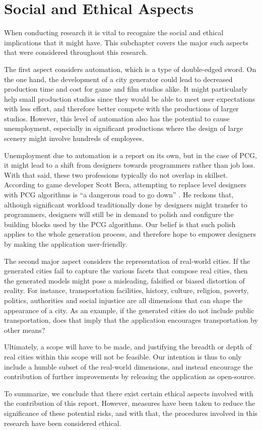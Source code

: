 \section{Social and Ethical Aspects}

When conducting research it is vital to recognize the social and ethical implications that it might have.
This subchapter covers the major such aspects that were considered throughout this research.

The first aspect considers automation, which is a type of double-edged sword.
On the one hand, the development of a city generator could lead to decreased production time and cost for game and film studios alike.
It might particularly help small production studios since they would be able to meet user expectations with less effort, and therefore better compete with the productions of larger studios.
However, this level of automation also has the potential to cause unemployment, especially in significant productions where the design of large scenery might involve hundreds of employees.

Unemployment due to automation is a report on its own, but in the case of PCG, it might lead to a shift from designers towards programmers rather than job loss.
With that said, these two professions typically do not overlap in skillset.
According to game developer Scott Beca, attempting to replace level designers with PCG algorithms is ``a dangerous road to go down'' \cite{gamasutra}.
He reckons that, although significant workload traditionally done by designers might transfer to programmers, designers will still be in demand to polish and configure the building blocks used by the PCG algorithms.
Our belief is that such polish applies to the whole generation process, and therefore hope to empower designers by making the application user-friendly.

The second major aspect considers the representation of real-world cities.
If the generated cities fail to capture the various facets that compose real cities, then the generated models might pose a misleading, falsified or biased distortion of reality.
For instance, transportation facilities, history, culture, religion, poverty, politics, authorities and social injustice are all dimensions that can shape the appearance of a city.
As an example, if the generated cities do not include public transportation, does that imply that the application encourages transportation by other means?

Ultimately, a scope will have to be made, and justifying the breadth or depth of real cities within this scope will not be feasible.
Our intention is thus to only include a humble subset of the real-world dimensions, and instead encourage the contribution of further improvements by releasing the application as open-source.

To summarize, we conclude that there exist certain ethical aspects involved with the contribution of this report.
However, measures have been taken to reduce the significance of these potential risks, and with that, the procedures involved in this research have been considered ethical.

\newpage